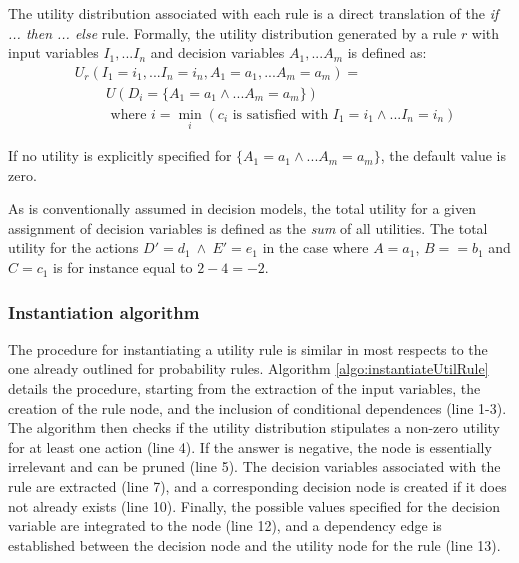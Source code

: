 The utility distribution associated with each rule is a direct translation of the  \textit{if ... then ... else} rule.  Formally, the utility distribution generated by a rule $r$ with input variables $I_1,...I_n$ and decision variables $A_1,...A_m$ is defined as:
\begin{align}
& U_r(I_1\!=\!i_1,... I_n\!=\!i_n, A_1\!=\!a_1,... A_m\!=\!a_m) = \nonumber \\ 
& \; \; \; \; \; \; \; \; U(D_i = \{A_1\!=\!a_1 \land... A_m\!=\!a_m\}) \label{eq:utildistrib}\\
&  \; \; \; \; \; \; \; \; \text{ where } i = \min_i (c_i \text{ is satisfied with } I_1\!=\!i_1 \land ... I_n\!=\!i_n) \nonumber
\end{align}

If no utility is explicitly specified for $\{A_1\!=\!a_1 \land... A_m\!=\!a_m\}$, the default value is zero. 

As is conventionally assumed in decision models, the total utility for a given assignment of decision variables is defined as the \textit{sum} of all utilities.  The total utility for the actions $D'\!=\!d_1 \ \land \ E'\!=\!e_1$ in the case where $A\!=\!a_1$, $B=\!=\!b_1$ and $C\!=\!c_1$ is for instance equal to $2 - 4 = -2$. 


\subsubsection*{Instantiation algorithm} 

The procedure for instantiating a utility rule is similar in most respects to the one already outlined for probability rules. Algorithm \ref{algo:instantiateUtilRule} details the procedure, starting from the extraction of the input variables, the creation of the rule node, and the inclusion of conditional dependences (line 1-3). The algorithm then checks if the utility distribution stipulates a non-zero utility for at least one action (line 4).  If the answer is negative, the node is essentially irrelevant and can be pruned (line 5).  The decision variables associated with the rule are extracted (line 7), and a corresponding decision node is created if it does not already exists (line 10). Finally, the possible values specified for the decision variable are integrated to the node (line 12), and a dependency edge is established between the decision node and the utility node for the rule (line 13). 

